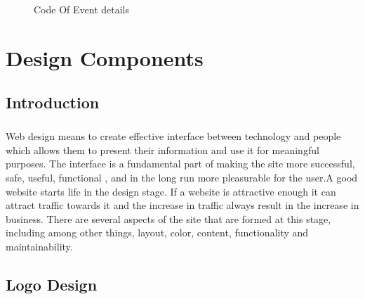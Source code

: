 \documentclass[12pt,a4paper,class,twoside,openany]{report}
\begin{document}
{\begin{figure}
\begin{center}
\caption{Code Of Event details}
\label{fg:5-7}
\end{center}
\end{figure}
\cleardoublepage
\chapter{Design Components }
\section{Introduction}
\paragraph*{\hspace{.9 cm} }  Web design means to create effective interface between technology and people which allows them to present their information and use it for meaningful purposes. The interface is a fundamental part of making the site more successful, safe, useful, functional , and in the long run more pleasurable for the user.A good website starts life in the design stage. If a website is attractive enough it can attract traffic towards it and the increase in traffic always result in the increase in business. There are several aspects of the site that are formed at this stage, including among other things, layout, color, content, functionality and maintainability.
\section{Logo Design}
}
\end{document}
